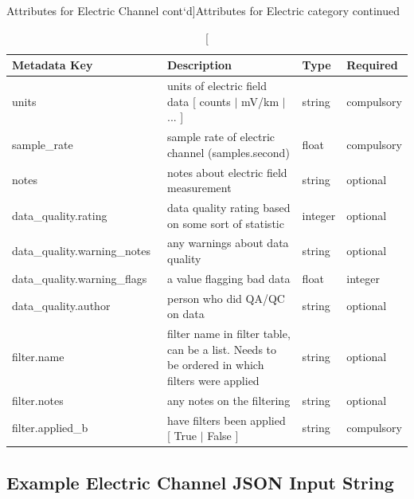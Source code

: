 \documentclass{article}
\begin{document}
\newpage
\begin{table}[htb!]
    \caption[Attributes for Electric Channel cont`d]{Attributes for Electric category continued}
    \begin{tabular}{|l|p{3in}|l|l|}
        \hline
        \textbf{Metadata Key} & \textbf{Description} & \textbf{Type} & \textbf{Required} \\ \hline
        units\ & units of electric field data [ counts $|$ mV/km $|$ ... ] & string & compulsory \\ \hline
        sample\_rate\ & sample rate of electric channel (samples.second) & float & compulsory \\ \hline
        notes\ & notes about electric field measurement & string &  optional \\ \hline
        data\_quality.rating\ & data quality rating based on some sort of statistic & integer & optional \\ \hline
        data\_quality.warning\_notes\ & any warnings about data quality & string & optional \\ \hline
        data\_quality.warning\_flags\ & a value flagging bad data  & float &  integer \\ \hline
        data\_quality.author\ & person who did QA/QC on data & string &  optional \\ \hline
        filter.name\ & filter name in filter table, can be a list. Needs to be ordered in which filters were applied & string &  optional \\ \hline
        filter.notes\ & any notes on the filtering & string &  optional \\ \hline
        filter.applied\_b & have filters been applied [ True $|$ False ] & string & compulsory \\ \hline
        \end{tabular}
        \label{tab:electric02}
\end{table}    

\newpage
\subsection{Example Electric Channel JSON Input String}
\end{document}

